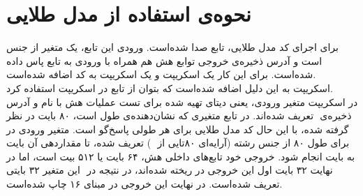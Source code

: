 \section{\textbf{نحوه‌ی استفاده از مدل طلایی}}
برای اجرای کد مدل طلایی، تابع  صدا شده‌است. ورودی این تابع، یک متغیر از جنس   است و آدرس ذخیره‌ی ‌خروجی توابع هش هم همراه با ورودی به تابع پاس داده شده‌است. برای این کار یک اسکریپت \href{https://github.com/VahidZee/SkeinHashingHDL/blob/master/SourceCode/C/main.c}{}  و یک اسکریپت \href{https://github.com/VahidZee/SkeinHashingHDL/blob/master/SourceCode/C/skeinhash.h}{}  به کد اضافه شده‌است. \\ اسکریپت   به این دلیل اضافه شده‌است که بتوان از تابع  در اسکریپت   استفاده کرد.\\ در اسکریپت  متغیر ورودی، یعنی دیتای ‌تهیه شده برای تست عملیات هش  با نام و آدرس ذخیره‌ی ‌ تعریف شده‌اند. در تابع  متغیری که نشان‌دهنده‌ی طول  است،  ۸۰ بایت در نظر گرفته شده، با این حال کد مدل طلایی برای هر طولی پاسخ‌گو است. متغیر ‌ورودی در   برای طول ۸۰ از جنس رشته (‌آرایه‌ای ۸۰تایی از ‌ ) تعریف شده‌‌، تا مقداردهی آن بایت به بایت انجام شود. خروجی خود تابع‌های داخلی هش، ۶۴ بایت یا ۵۱۲ بیت است، اما در نهایت ۳۲ بایت اول این خروجی در  ریخته شده‌اند، در نتیجه در ‌ این متغیر ۳۲ بایتی تعریف شده‌است. در نهایت این خروجی در مبنای ۱۶ چاپ شده‌است.
